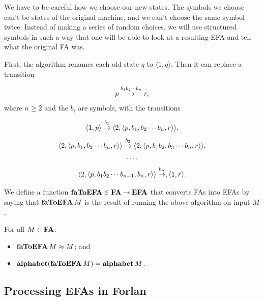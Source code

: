 We have to be careful how we choose our new states.  The
symbols we choose can't be states of the original machine, and we
can't choose the same symbol twice.  Instead of making a series of
random choices, we will use structured symbols in such a way that
one will be able to look at a resulting EFA and tell what the
original FA was.

First, the algorithm renames each old state $q$ to
$\langle 1,q\rangle$.  Then it can replace a transition
\begin{gather*}
p\stackrel{\strut b_1b_2\cdots b_n}{\rightarrow}r,
\end{gather*}
where $n\geq 2$ and the $b_i$ are symbols, with the transitions
\begin{gather*}
\langle 1,p\rangle\stackrel{\strut b_1}{\rightarrow}
\langle 2,\langle p,b_1,b_2\cdots b_n,r\rangle\rangle, \\
\langle 2,\langle p,b_1,b_2\cdots b_n,r\rangle\rangle\stackrel{\strut b_2}{\rightarrow}
\langle 2,\langle p,b_1b_2,b_3\cdots b_n,r\rangle\rangle, \\
\ldots,\\
\langle 2,\langle p,b_1b_2\cdots b_{n-1},b_n,r\rangle\rangle\stackrel{\strut b_n}{\rightarrow},
\langle 1,r\rangle.
\end{gather*}

%
%
We define a function $\mathbf{faToEFA}\in\mathbf{FA}\mathbin{\to}\mathbf{EFA}$ that converts FAs into
EFAs by saying that $\mathbf{faToEFA}\,M$ is the result of running the above
algorithm on input $M$.

\begin{theorem}
For all $M\in\mathbf{FA}$:
\begin{itemize}
\item $\mathbf{faToEFA}\,M\approx M$; and

\item $\mathbf{alphabet}(\mathbf{faToEFA}\,M) = \mathbf{alphabet}\,M$.
\end{itemize}
\end{theorem}

\subsection{Processing EFAs in Forlan}

